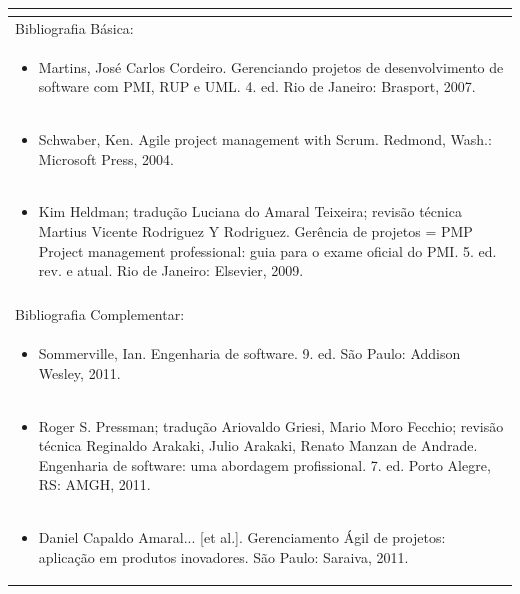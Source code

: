 \documentclass[11pt]{article}
\begin{document}
\begin{center}
\begin{longtable}{|p{4cm}|p{4cm}|p{4cm}|p{4cm}|}
\multicolumn{4}{|p{\dimexpr 16cm + 6\tabcolsep\relax}|}{}\\
\hline
\multicolumn{4}{|p{16cm}|}{Bibliografia Básica:}\\*
\multicolumn{4}{|p{\dimexpr 16cm + 6\tabcolsep\relax}|}{\begin{itemize}\item Martins, José Carlos Cordeiro. Gerenciando projetos de desenvolvimento de software com PMI, RUP e UML. 4. ed. Rio de Janeiro: Brasport, 2007.\end{itemize}}\\
\multicolumn{4}{|p{\dimexpr 16cm + 6\tabcolsep\relax}|}{\begin{itemize}\item Schwaber, Ken. Agile project management with Scrum. Redmond, Wash.: Microsoft Press, 2004.\end{itemize}}\\
\multicolumn{4}{|p{\dimexpr 16cm + 6\tabcolsep\relax}|}{\begin{itemize}\item Kim Heldman; tradução Luciana do Amaral Teixeira; revisão técnica Martius Vicente Rodriguez Y Rodriguez. Gerência de projetos = PMP Project management professional: guia para o exame oficial do PMI. 5. ed. rev. e atual. Rio de Janeiro: Elsevier, 2009.\end{itemize}}\\
\multicolumn{4}{|p{16cm}|}{}\\
\hline
\multicolumn{4}{|p{16cm}|}{Bibliografia Complementar:}\\*
\multicolumn{4}{|p{\dimexpr 16cm + 6\tabcolsep\relax}|}{\begin{itemize}\item Sommerville, Ian. Engenharia de software. 9. ed. São Paulo: Addison Wesley, 2011.\end{itemize}}\\
\multicolumn{4}{|p{\dimexpr 16cm + 6\tabcolsep\relax}|}{\begin{itemize}\item Roger S. Pressman; tradução Ariovaldo Griesi, Mario Moro Fecchio; revisão técnica Reginaldo Arakaki, Julio Arakaki, Renato Manzan de Andrade. Engenharia de software: uma abordagem profissional. 7. ed. Porto Alegre, RS: AMGH, 2011.\end{itemize}}\\
\multicolumn{4}{|p{\dimexpr 16cm + 6\tabcolsep\relax}|}{\begin{itemize}\item Daniel Capaldo Amaral... [et al.]. Gerenciamento Ágil de projetos: aplicação em produtos inovadores. São Paulo: Saraiva, 2011.\end{itemize}}\\

\end{longtable}
\end{center}
\end{document}
